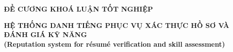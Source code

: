 \documentclass{article}[14pt]
\begin{document}
    \begin{figure}[h]
        \begin{floatrow}
        {%
    
        }
        {%
    
        }
        \end{floatrow}
    \end{figure}
    
    \begin{center}
        
        \textbf{\huge ĐỀ CƯƠNG KHOÁ LUẬN TỐT NGHIỆP} \\ 
    \end{center}
    
    
    \begin{center}
        
        \textbf{\Large HỆ THỐNG DANH TIẾNG PHỤC VỤ XÁC THỰC HỒ SƠ VÀ ĐÁNH GIÁ KỸ NĂNG} 
        \\
        
    \vspace{.5cm}
        \textbf{\Large (Reputation system for résumé verification and skill assessment)}
    \end{center}
    
\end{document}
